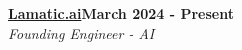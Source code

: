 \documentclass[letterpaper,10pt]{article}
\newcommand{\heading}[2]{
  \hspace{10pt}#1\hfill#2\\
}
\newcommand{\headingBf}[2]{
  \heading{\textbf{#1}}{\textbf{#2}}
}
\newcommand{\headingIt}[2]{
  \heading{\textit{#1}}{\textit{#2}}
}
\begin{document}







\headingBf{\href{https://lamatic.ai/}{Lamatic.ai}}{March 2024 - Present}
\headingIt{Founding Engineer - AI}{}
\end{document}
